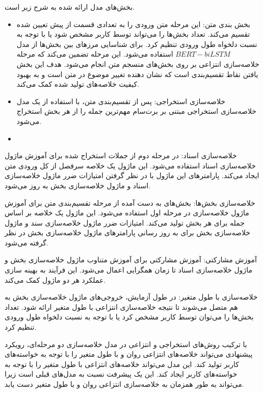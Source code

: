 بخش‌‌های مدل ارائه شده به شرح زیر است.
\\
\begin{itemize}
	\item {
		بخش بندی متن: این مرحله متن ورودی را به تعدادی قسمت از پیش تعیین شده تقسیم می‌کند. تعداد بخش‌ها را می‌تواند توسط کاربر مشخص شود یا با توجه به نسبت دلخواه طول ورودی تنظیم کرد.
		برای شناسایی مرزهای بین بخش‌ها از مدل $ BERT-biLSTM $ استفاده می‌شود. این مرحله تضمین می‌کند که مرحله خلاصه‌سازی انتزاعی بر روی بخش‌های منسجم متن انجام می‌شود. هدف این بخش یافتن نقاط تقسیم‌بندی است که نشان دهنده تغییر موضوع در متن است و  به بهبود کیفیت خلاصه‌های تولید شده کمک می‌کند. 
	}
	\item {
		خلاصه‌سازی استخراجی: پس از تقسیم‌بندی متن، با استفاده از یک مدل خلاصه‌سازی استخراجی مبتنی بر برت‌سام
		مهم‌ترین جمله را از هر بخش استخراج می‌شود.
	}
	\item {
		
	}
	
\end{itemize}




خلاصه‌سازی اسناد: در مرحله دوم از جملات استخراج شده برای آموزش ماژول خلاصه‌سازی اسناد استفاده می‌شود. این ماژول یک خلاصه سرفصل از کل ورودی متن ایجاد می‌کند. پارامترهای این ماژول با در نظر گرفتن امتیازات ضرر ماژول خلاصه‌سازی اسناد و ماژول خلاصه‌سازی بخش به روز می‌شود.

خلاصه‌سازی بخش‌ها: بخش‌های به دست آمده از مرحله تقسیم‌بندی متن برای آموزش ماژول خلاصه‌سازی در مرحله اول استفاده می‌شود. این ماژول یک خلاصه بر اساس جمله برای هر بخش تولید می‌کند. امتیازات ضرر ماژول خلاصه‌سازی سند و ماژول خلاصه‌سازی بخش برای به روز رسانی پارامترهای ماژول خلاصه‌سازی بخش در نظر گرفته می‌شود.

آموزش مشارکتی: آموزش مشارکتی برای آموزش متناوب ماژول خلاصه‌سازی بخش و ماژول خلاصه‌سازی اسناد تا زمان همگرایی اعمال می‌شود. این فرآیند به بهینه سازی عملکرد هر دو ماژول کمک می‌کند.

خلاصه‌سازی با طول متغیر: در طول آزمایش، خروجی‌های ماژول خلاصه‌سازی بخش به هم متصل می‌شوند تا نتیجه خلاصه‌سازی انتزاعی با طول متغیر ارائه شود. تعداد بخش‌ها را می‌توان توسط کاربر مشخص کرد یا با توجه به نسبت دلخواه طول ورودی تنظیم کرد.

با ترکیب روش‌های استخراجی و انتزاعی در مدل خلاصه‌سازی دو مرحله‌ای، رویکرد پیشنهادی می‌تواند خلاصه‌های انتزاعی روان و با طول متغیر را با توجه به خواسته‌های کاربر تولید کند.
این مدل می‌تواند خلاصه‌های انتزاعی با طول متغیر را با توجه به خواسته‌های کاربر ایجاد کند. این یک پیشرفت نسبت به مدل‌های قبلی است زیرا می‌تواند به طور همزمان به خلاصه‌سازی انتزاعی روان و با طول متغیر دست یابد.






